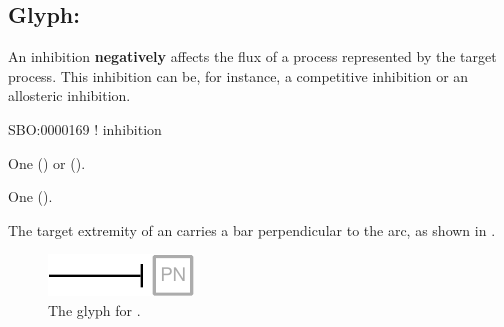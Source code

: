 \subsection{Glyph: }
\label{sec:inhibition}

An inhibition \textbf{negatively} affects the flux of a process represented by the target process.
This inhibition can be, for instance, a competitive inhibition or an allosteric inhibition.

\begin{glyphDescription}

\glyphSboTerm
SBO:0000169 ! inhibition

\glyphOrigin
One  () or  ().

\glyphTarget
One  ().

\glyphSymbol
The target extremity of an  carries a bar perpendicular to the arc, as shown in .

\end{glyphDescription}

\begin{figure}[H]
  \centering
  \includegraphics{images/build/inhibition.pdf}
  \caption{The \PD glyph for .}
  \label{fig:inhibition}
\end{figure} 
